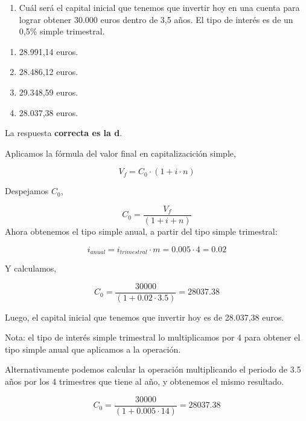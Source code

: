 \documentclass[
  letterpaper,
  DIV=11,
  numbers=noendperiod]{scrreprt}
\providecommand{\tightlist}{%
  \setlength{\itemsep}{0pt}\setlength{\parskip}{0pt}}\usepackage{longtable,booktabs,array}
\begin{document}
\begin{enumerate}
\def\labelenumi{\arabic{enumi}.}
\setcounter{enumi}{2}
\tightlist
\item
  Cuál será el capital inicial que tenemos que invertir hoy en una
  cuenta para lograr obtener 30.000 euros dentro de 3,5 años. El tipo de
  interés es de un 0,5\% simple trimestral.
\end{enumerate}

\begin{enumerate}
\def\labelenumi{\alph{enumi})}
\item
  28.991,14 euros.
\item
  28.486,12 euros.
\item
  29.348,59 euros.
\item
  28.037,38 euros.
\end{enumerate}

\begin{tcolorbox}[enhanced jigsaw, left=2mm, opacityback=0, colback=white, breakable, arc=.35mm, bottomrule=.15mm, rightrule=.15mm, toprule=.15mm, leftrule=.75mm, colframe=quarto-callout-tip-color-frame]
\begin{minipage}[t]{5.5mm}
\textcolor{quarto-callout-tip-color}{\faLightbulb}
\end{minipage}%
\begin{minipage}[t]{\textwidth - 5.5mm}

La respuesta \textbf{correcta es la d}.

Aplicamos la fórmula del valor final en capitalizacición simple,

\[V_f=C_0\cdot(1+i\cdot n)\]

Despejamos \(C_0\),

\[C_0=\frac{V_f}{\left(1+i+n\right)}\] Ahora obtenemos el tipo simple
anual, a partir del tipo simple trimestral:

\[i_{anual}=i_{trimestral}\cdot m=0.005\cdot4=0.02\]

Y calculamos,

\[C_0=\frac{30000}{\left(1+0.02\cdot3.5\right)}=28037.38\]

Luego, el capital inicial que tenemos que invertir hoy es de 28.037,38
euros.

Nota: el tipo de interés simple trimestral lo multiplicamos por 4 para
obtener el tipo simple anual que aplicamos a la operación.

Alternativamente podemos calcular la operación multiplicando el periodo
de 3.5 años por los 4 trimestres que tiene al año, y obtenemos el mismo
resultado.

\[C_0=\frac{30000}{\left(1+0.005\cdot14\right)}=28037.38\]

\end{minipage}%
\end{tcolorbox}
\end{document}
